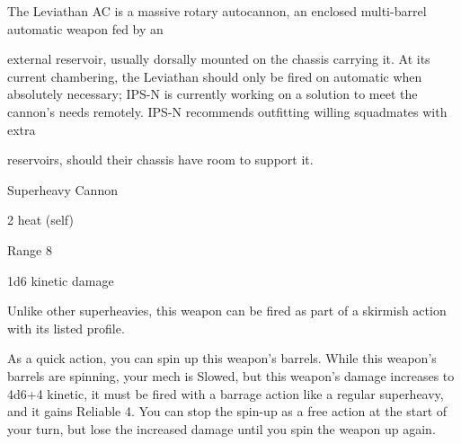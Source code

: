 The Leviathan AC is a massive rotary autocannon, an enclosed multi-barrel automatic weapon fed by an  

external reservoir, usually dorsally mounted on the chassis carrying it. At its current chambering, the  
Leviathan should only be fired on automatic when absolutely necessary; IPS-N is currently working on a  
solution to meet the cannon’s needs remotely. IPS-N recommends outfitting willing squadmates with extra  

reservoirs, should their chassis have room to support it.   

Superheavy Cannon
 
2 heat (self)
 
Range 8
 
1d6 kinetic damage
 

Unlike other superheavies, this weapon can be fired as part of a skirmish action with its listed  
profile.
 
As a quick action, you can spin up this weapon’s barrels. While this weapon’s barrels are  
spinning, your mech is Slowed, but this weapon’s damage increases to 4d6+4 kinetic, it must be  
fired with a barrage action like a regular superheavy, and it gains Reliable 4. You can stop the  
spin-up as a free action at the start of your turn, but lose the increased damage until you spin the  
weapon up again.
 